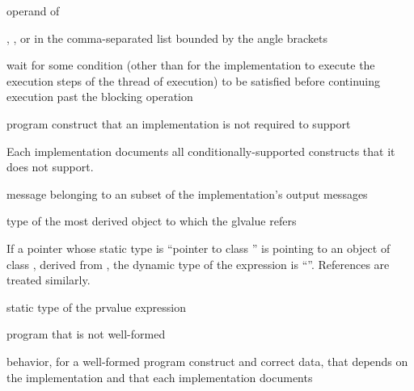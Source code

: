 %
%
 operand of 

%
%
,
, or
 in the comma-separated
list bounded by the angle brackets

%
wait for some condition (other than for the implementation to execute
the execution steps of the thread of execution) to be satisfied before
continuing execution past the blocking operation

%
program construct that an implementation is not required to support

\begin{defnote}
Each implementation documents all conditionally-supported
constructs that it does not support.
\end{defnote}

%
message belonging to an  subset of the
implementation's output messages

%
 type of the most derived object to which the
glvalue refers

\begin{example}
If a pointer  whose static type is ``pointer to
class '' is pointing to an object of class , derived
from , the dynamic type of the
expression  is ``''. References are
treated similarly.
\end{example}

%
 static type of the prvalue expression

%
program that is not well-formed

%
behavior, for a well-formed program construct and correct data, that
depends on the implementation and that each implementation documents

